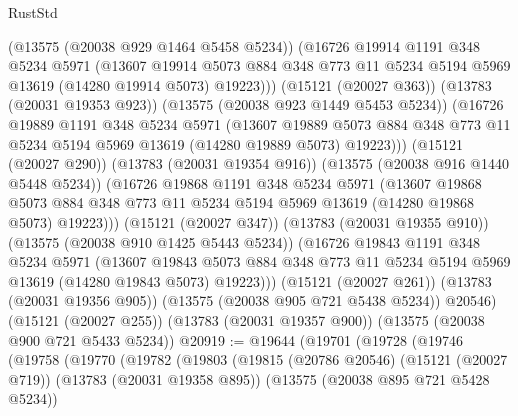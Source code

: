 \begin{lexlean}{RustStd}
\begin{coremodule}
              (@13575 (@20038 @929 @1464 @5458 @5234))
              (@16726
                @19914
                @1191
                @348
                @5234
                @5971
                (@13607
                  @19914
                  @5073
                  @884
                  @348
                  @773
                  @11
                  @5234
                  @5194
                  @5969
                  @13619
                  (@14280 @19914 @5073)
                  @19223)))
            (@15121 (@20027 @363))
            (@13783 (@20031 @19353 @923))
            (@13575 (@20038 @923 @1449 @5453 @5234))
            (@16726
              @19889
              @1191
              @348
              @5234
              @5971
              (@13607
                @19889
                @5073
                @884
                @348
                @773
                @11
                @5234
                @5194
                @5969
                @13619
                (@14280 @19889 @5073)
                @19223)))
          (@15121 (@20027 @290))
          (@13783 (@20031 @19354 @916))
          (@13575 (@20038 @916 @1440 @5448 @5234))
          (@16726
            @19868
            @1191
            @348
            @5234
            @5971
            (@13607
              @19868
              @5073
              @884
              @348
              @773
              @11
              @5234
              @5194
              @5969
              @13619
              (@14280 @19868 @5073)
              @19223)))
        (@15121 (@20027 @347))
        (@13783 (@20031 @19355 @910))
        (@13575 (@20038 @910 @1425 @5443 @5234))
        (@16726
          @19843
          @1191
          @348
          @5234
          @5971
          (@13607
            @19843
            @5073
            @884
            @348
            @773
            @11
            @5234
            @5194
            @5969
            @13619
            (@14280 @19843 @5073)
            @19223)))
      (@15121 (@20027 @261))
      (@13783 (@20031 @19356 @905))
      (@13575 (@20038 @905 @721 @5438 @5234))
      @20546)
    (@15121 (@20027 @255))
    (@13783 (@20031 @19357 @900))
    (@13575 (@20038 @900 @721 @5433 @5234))
@20919 := @19644
    (@19701
      (@19728
        (@19746
          (@19758
            (@19770
              (@19782
                (@19803
                  (@19815
                    (@20786 @20546)
                    (@15121 (@20027 @719))
                    (@13783 (@20031 @19358 @895))
                    (@13575 (@20038 @895 @721 @5428 @5234))

\end{coremodule}
\end{lexlean}
